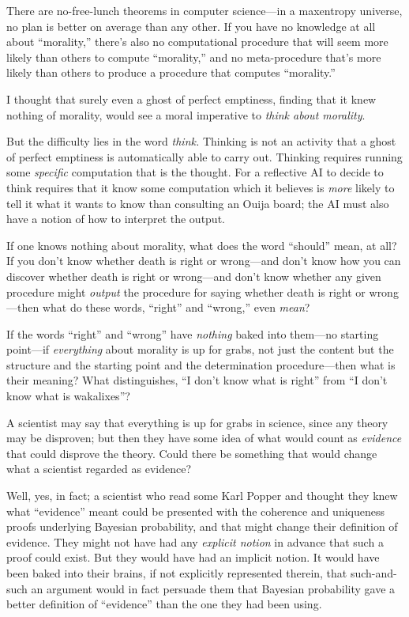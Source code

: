  There are no-free-lunch theorems in computer science---in a
maxentropy universe, no plan is better on average than any other. If
you have no knowledge at all about
``morality,''
there's also no computational procedure that will seem
more likely than others to compute
``morality,'' and no meta-procedure
that's more likely than others to produce a procedure
that computes ``morality.''


 I thought that surely even a ghost of perfect emptiness, finding
that it knew nothing of morality, would see a moral imperative to
\textit{think about morality}.


 But the difficulty lies in the word \textit{think.} Thinking is
not an activity that a ghost of perfect emptiness is automatically able
to carry out. Thinking requires running some \textit{specific}
computation that is the thought. For a reflective AI to decide to think
requires that it know some computation which it believes is
\textit{more} likely to tell it what it wants to know than consulting
an Ouija board; the AI must also have a notion of how to interpret the
output.


 If one knows nothing about morality, what does the word
``should'' mean, at all? If you
don't know whether death is right or wrong---and
don't know how you can discover whether death is right
or wrong---and don't know whether any given procedure
might \textit{output} the procedure for saying whether death is right
or wrong---then what do these words,
``right'' and
``wrong,'' even \textit{mean}?


 If the words ``right'' and
``wrong'' have \textit{nothing}
baked into them---no starting point---if \textit{everything} about
morality is up for grabs, not just the content but the structure and
the starting point and the determination procedure---then what is their
meaning? What distinguishes, ``I don't
know what is right'' from ``I
don't know what is wakalixes''?


 A scientist may say that everything is up for grabs in science,
since any theory may be disproven; but then they have some idea of what
would count as \textit{evidence} that could disprove the theory. Could
there be something that would change what a scientist regarded as
evidence?


 Well, yes, in fact; a scientist who read some Karl Popper and
thought they knew what ``evidence''
meant could be presented with the coherence and uniqueness proofs
underlying Bayesian probability, and that might change their definition
of evidence. They might not have had any \textit{explicit notion} in
advance that such a proof could exist. But they would have had an
implicit notion. It would have been baked into their brains, if not
explicitly represented therein, that such-and-such an argument would in
fact persuade them that Bayesian probability gave a better definition
of ``evidence'' than the one they
had been using.


